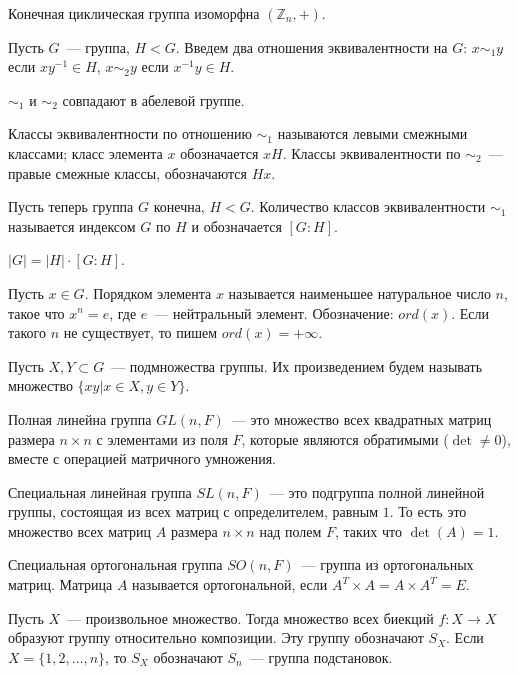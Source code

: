 \documentclass{article}
\begin{document}
	\begin{theorem}
		Конечная циклическая группа изоморфна $(\mathbb{Z}_n, +)$.
	\end{theorem}
	\begin{definition}
		Пусть $G$~--- группа, $H < G$. Введем два отношения эквивалентности на $G$: $x \sim_1 y$ если $xy^{-1} \in H$, $x \sim_2 y$ если $x^{-1}y \in H$.
	\end{definition}
	\begin{statement}
		$\sim_1$ и $\sim_2$ совпадают в абелевой группе.
	\end{statement}
	\begin{note}
		Классы эквивалентности по отношению $\sim_1$ называются левыми смежными классами; класс элемента $x$ обозначается $xH$. Классы эквивалентности по $\sim_2$~--- правые смежные классы, обозначаются $Hx$.
	\end{note}
	\begin{definition}
		Пусть теперь группа $G$ конечна, $H < G$. Количество классов эквивалентности $\sim_1$ называется индексом $G$ по $H$ и обозначается $[G : H]$.
	\end{definition}
	\begin{theorem}[Лагранжа]
		$|G| = |H| \cdot [G : H]$.
	\end{theorem}
	\begin{definition}
		Пусть $x \in G$. Порядком элемента $x$ называется наименьшее натуральное число $n$, такое что $x^n = e$, где $e$~--- нейтральный элемент. Обозначение: $ord(x)$. Если такого $n$ не существует, то пишем $ord(x) = + \infty$.
	\end{definition}
	\begin{definition}
		Пусть $X, Y \subset G$~--- подмножества группы. Их произведением будем называть множество $\{ xy | x \in X, y \in Y \}$.
	\end{definition}
	\begin{definition}
		Полная линейна группа $GL(n, F)$~--- это множество всех квадратных матриц размера $n \times n$ с элементами из поля $F$, которые являются обратимыми ($\det \not= 0$), вместе с операцией матричного умножения.
	\end{definition}
	\begin{definition}
		Специальная линейная группа $SL(n, F)$~--- это подгруппа полной линейной группы, состоящая из всех матриц с определителем, равным $1$. То есть это множество всех матриц $A$ размера $n \times n$ над полем $F$, таких что $\det(A) = 1$.
	\end{definition}
	\begin{definition}
		Специальная ортогональная группа $SO(n, F)$~--- группа из ортогональных матриц. Матрица $A$ называется ортогональной, если $A^T \times A = A \times A^T = E$.
	\end{definition}
	\begin{statement}
		Пусть $X$~--- произвольное множество. Тогда множество всех биекций $f: X \rightarrow X$ образуют группу относительно композиции. Эту группу обозначают $S_X$. Если $X = \{ 1, 2, \dots, n \}$, то $S_X$ обозначают $S_n$~--- группа подстановок.
	\end{statement}
\end{document}
